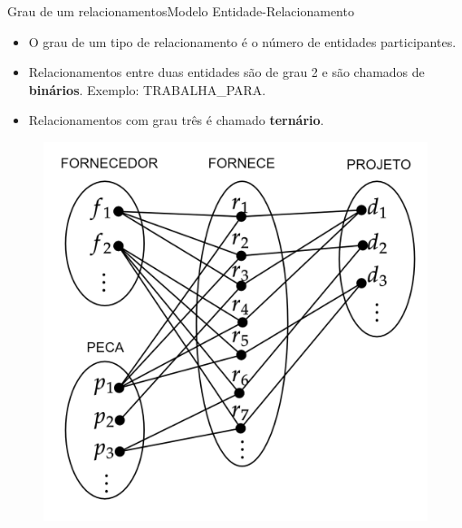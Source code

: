 \documentclass[t]{beamer}
\begin{document}
\begin{ftst}{Grau de um relacionamentos}{Modelo Entidade-Relacionamento}
\small
\begin{itemize}
    \item O grau de um tipo de relacionamento é o número de entidades participantes.
    \item Relacionamentos entre duas entidades são de grau 2 e são chamados de \textbf{binários}. Exemplo: TRABALHA\_PARA.
    \item Relacionamentos com grau três é chamado \textbf{ternário}.
\end{itemize}

\begin{figure}
    \centering
    \includegraphics[scale=0.12]{Figuras/01_9.png}
\end{figure}

\end{ftst}

\end{document}
